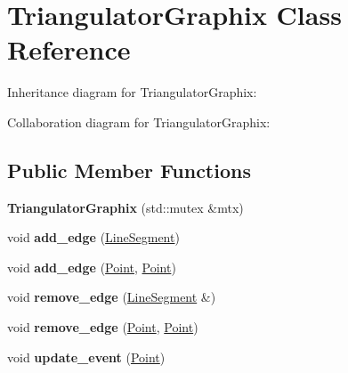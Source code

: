 \hypertarget{classTriangulatorGraphix}{}\section{Triangulator\+Graphix Class Reference}
\label{classTriangulatorGraphix}


Inheritance diagram for Triangulator\+Graphix\+:


Collaboration diagram for Triangulator\+Graphix\+:
\subsection*{Public Member Functions}
\begin{DoxyCompactItemize}
\item 
\mbox{\label{classTriangulatorGraphix_aac52b4a721e84a6fa9605708096f161d}} 
{\bfseries Triangulator\+Graphix} (std\+::mutex \&mtx)
\item 
\mbox{\label{classTriangulatorGraphix_a64eb2a66d462fff28b62768058a3d751}} 
void {\bfseries add\+\_\+edge} (\hyperlink{classLineSegment}{Line\+Segment})
\item 
\mbox{\label{classTriangulatorGraphix_a8c73e3d266116376d294d87d9794ac79}} 
void {\bfseries add\+\_\+edge} (\hyperlink{classPoint}{Point}, \hyperlink{classPoint}{Point})
\item 
\mbox{\label{classTriangulatorGraphix_a4ddeb992127c1f7552d0a2b2ec5f5a1c}} 
void {\bfseries remove\+\_\+edge} (\hyperlink{classLineSegment}{Line\+Segment} \&)
\item 
\mbox{\label{classTriangulatorGraphix_aaa5202504487003c7467852ba56b22fb}} 
void {\bfseries remove\+\_\+edge} (\hyperlink{classPoint}{Point}, \hyperlink{classPoint}{Point})
\item 
\mbox{\label{classTriangulatorGraphix_a7ffa03ab7b1d6011712d390891ec0fe7}} 
void {\bfseries update\+\_\+event} (\hyperlink{classPoint}{Point})
\item 
\mbox{\label{classTriangulatorGraphix_a58b91e3132120083d9e3623e5cc9aa61}} 

\end{DoxyCompactItemize}

